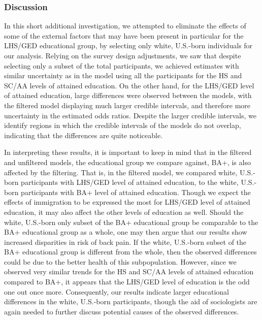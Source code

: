 \FloatBarrier
\subsubsection{Discussion}
\label{section:application2:extension:discussion}
In this short additional investigation, we attempted to eliminate the effects of some of the external factors that may have been present in particular for the LHS/GED educational group, by selecting only white, U.S.-born individuals for our analysis. Relying on the survey design adjustments, we saw that despite selecting only a subset of the total participants, we achieved estimates with similar uncertainty as in the model using all the participants for the HS and SC/AA levels of attained education. On the other hand, for the LHS/GED level of attained education, large differences were observed between the models, with the filtered model displaying much larger credible intervals, and therefore more uncertainty in the estimated odds ratios. Despite the larger credible intervals, we identify regions in which the credible intervals of the models do not overlap, indicating that the differences are quite noticeable. 

In interpreting these results, it is important to keep in mind that in the filtered and unfiltered models, the educational group we compare against, BA+, is also affected by the filtering. That is, in the filtered model, we compared white, U.S.-born participants with LHS/GED level of attained education, to the white, U.S.-born participants with BA+ level of attained education. Though we expect the effects of immigration to be expressed the most for LHS/GED level of attained education, it may also affect the other levels of education as well. Should the white, U.S.-born only subset of the BA+ educational group be comparable to the BA+ educational group as a whole, one may then argue that our results show increased disparities in risk of back pain. If the white, U.S.-born subset of the BA+ educational group is different from the whole, then the observed differences could be due to the better health of this subpopulation. However, since we observed very similar trends for the HS and SC/AA levels of attained education compared to BA+, it appears that the LHS/GED level of education is the odd one out once more. Consequently, our results indicate larger educational differences in the white, U.S.-born participants, though the aid of sociologists are again needed to further discuss potential causes of the observed differences. 














